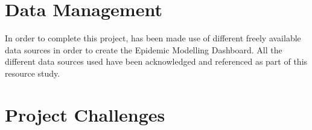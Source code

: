 
\section{Data Management}
In order to complete this project, has been made use of different freely available data sources in order to create the Epidemic Modelling Dashboard. All the different data sources used have been acknowledged and referenced as part of this resource study. 

\section{Project Challenges}